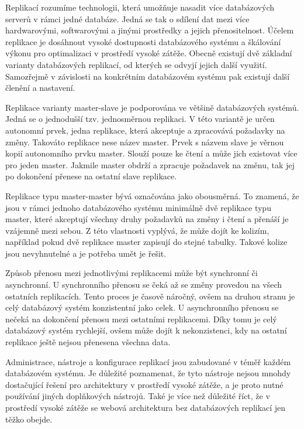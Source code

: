 \documentclass[12pt]{article}
\begin{document}
Replikací rozumíme technologii, která umožňuje nasadit více databázových serverů v rámci jedné databáze. Jedná se tak o sdílení dat mezi více hardwarovými, softwarovými a jinými prostředky a jejich přenositelnost. Účelem replikace je dosáhnout vysoké dostupnosti databázového systému a škálování výkonu pro optimalizaci v prostředí vysoké zátěže. Obecně existují dvě základní varianty databázových replikací, od kterých se odvyjí jejich další využití. Samozřejmě v závislosti na konkrétním databázovém systému pak existují další členění a nastavení. 

Replikace varianty master-slave je podporována ve většině databázových systémů. Jedná se o jednodušší tzv. jednosměrnou replikaci. V této variantě je určen autonomní prvek, jedna replikace, která akceptuje a zpracovává požadavky na změny. Takováto replikace nese název master. Prvek s názvem slave je věrnou kopií autonomního prvku master. Slouží pouze ke čtení a může jich existovat více pro jeden master. Jakmile master obdrží a zpracuje požadavek na změnu, tak jej po dokončení přenese na ostatní slave replikace.

Replikace typu master-master bývá označována jako obousměrná. To znamená, že jsou v rámci jednoho databázového systému minimálně dvě replikace typu master, které akceptují všechny druhy požadavků na změny i čtení a přenáší je vzájemně mezi sebou. Z této vlastnosti vyplývá, že může dojít ke kolizím, například pokud dvě replikace master zapisují do stejné tabulky. Takové kolize jsou nevyhnutelné a je potřeba umět je řešit.

Způsob přenosu mezi jednotlivými replikacemi může být synchronní či asynchronní. U synchronního přenosu se čeká až se změny provedou na všech ostatních replikacích. Tento proces je časově náročný, ovšem na druhou stranu je celý databázový systém konzistentní jako celek. U asynchronního přenosu se nečeká na dokončení přenosu mezi ostatními replikacemi. Díky tomu je celý databázový systém rychlejší, ovšem může dojít k nekonzistenci, kdy na ostatní replikace ještě nejsou přenesena všechna data.

Administrace, nástroje a konfigurace replikací jsou zabudované v téměř každém databázovém systému. Je důležité poznamenat, že tyto nástroje nejsou mnohdy dostačující řešení pro architektury v prostředí vysoké zátěže, a je proto nutné používání jiných doplňkových nástrojů. Také je více než důležité říct, že v prostředí vysoké zátěže se webová architektura bez databázových replikací jen těžko obejde.\cite{replikace}
\end{document}
